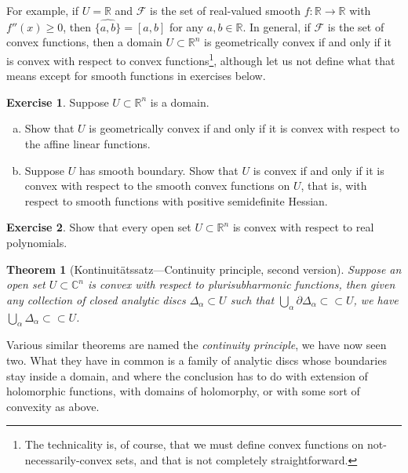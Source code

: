 \documentclass[12pt,openany]{book}
\newcommand{\C}{{\mathbb{C}}}
\newcommand{\R}{{\mathbb{R}}}
\newcommand{\sF}{{\mathscr{F}}}
\theoremstyle{plain}
\newtheorem{thm}{Theorem}[section]
\theoremstyle{remark}
\theoremstyle{definition}
\newenvironment{exbox}{%
    \def\FrameCommand{\vrule width 1pt \relax\hspace{10pt}}%
    \MakeFramed{\advance\hsize-\width\FrameRestore}%
}{%
    \endMakeFramed
}
\newenvironment{exparts}{%
    \leavevmode\begin{enumerate}[a),noitemsep,topsep=0pt,parsep=0pt,partopsep=0pt]
}{%
    \end{enumerate}
}
\theoremstyle{exercise}
\newtheorem{exercise}{Exercise}[section]
\theoremstyle{example}
\begin{document}
For example, if $U=\R$ and $\sF$ is the set of real-valued smooth
$f \colon \R \to \R$ with $f''(x) \geq 0$, then
$\widehat{\{ a, b \}} = [a,b]$ for any $a,b \in \R$.
In general, if $\sF$ is the set of convex functions, then
a domain $U \subset \R^n$ is geometrically convex if and only if it is
convex with respect to convex functions\footnote{%
The technicality is, of course, that we must define convex functions on
not-necessarily-convex sets, and that is not completely straightforward.},
although let us not define
what that means except for smooth functions in exercises below.

\begin{exbox}
\begin{exercise} \label{exercise:geomconvexfuncs}
Suppose $U \subset \R^n$ is a domain.
\begin{exparts}
\item
Show that $U$
is geometrically convex if and only if it is
convex with respect to the affine linear functions.
\item
Suppose $U$
has smooth boundary.
Show that $U$ is
convex if and only if it is
convex with respect to the smooth convex functions on $U$,
that is, with respect to smooth functions with positive semidefinite Hessian.
\end{exparts}
\end{exercise}

\begin{exercise}
Show that every open set $U \subset \R^n$ is convex with respect to real
polynomials.
\end{exercise}
\end{exbox}

\begin{thm}[Kontinuit\"atssatz---Continuity
principle, second version]
\label{thm:contprinciple2}
Suppose an open set $U \subset \C^n$ is convex with respect to plurisubharmonic
functions,
then given any collection of closed analytic discs $\Delta_\alpha \subset U$
such that $\bigcup_\alpha \partial \Delta_\alpha \subset \subset U$,
we have
$\bigcup_\alpha \Delta_\alpha \subset \subset U$.
\end{thm}

Various similar theorems are named the \emph{continuity principle},
we have now seen two.
What they have in common is a family of analytic discs whose
boundaries stay inside a domain, and where the conclusion has to do
with extension of holomorphic functions, with domains of holomorphy, or
with some sort of convexity as above.
\end{document}
